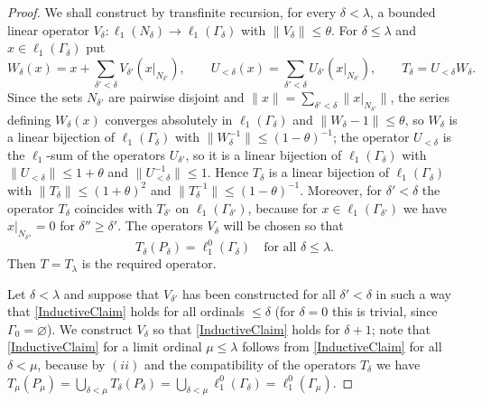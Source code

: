 \documentclass[12pt]{article}
\newcommand{\lo}[1]{\ell_1^0(#1)}
\newcommand{\ellone}[1]{\ell_1(#1)}
\newcommand{\norm}[1]{\lVert #1\rVert}
\begin{document}
\begin{proof} We shall construct by transfinite recursion, for every
    $\delta<\lambda$, a bounded linear operator
    $V_\delta:\ellone{N_\delta}\to\ellone{\Gamma_\delta}$ with
    $\norm{V_\delta}\leq\theta$. For $\delta\leq\lambda$ and
    $x\in\ellone{\Gamma_\delta}$ put
    \[
    W_\delta(x)=x+\sum_{\delta'<\delta}V_{\delta'}(x|_{N_{\delta'}}),\qquad
    U_{<\delta}(x)=\sum_{\delta'<\delta}U_{\delta'}(x|_{N_{\delta'}}),\qquad
    T_\delta=U_{<\delta}W_\delta.
    \]
    Since the sets $N_{\delta'}$ are pairwise disjoint and
    $\norm{x}=\sum_{\delta'<\delta}\norm{x|_{N_{\delta'}}}$, the series defining
    $W_\delta(x)$ converges absolutely in $\ellone{\Gamma_\delta}$ and
    $\norm{W_\delta-1}\leq\theta$, so $W_\delta$ is a linear bijection of
    $\ellone{\Gamma_\delta}$ with $\norm{W_\delta^{-1}}\leq{(1-\theta)}^{-1}$;
    the operator $U_{<\delta}$ is the $\ell_1$-sum of the operators
    $U_{\delta'}$, so it is a linear bijection of $\ellone{\Gamma_\delta}$ with
    $\norm{U_{<\delta}}\leq 1+\theta$ and $\norm{U_{<\delta}^{-1}}\leq 1$.
    Hence $T_\delta$ is a linear bijection of $\ellone{\Gamma_\delta}$ with
    $\norm{T_\delta}\leq{(1+\theta)}^2$ and $\norm{T_\delta^{-1}}\leq{(1-\theta)}^{-1}$.
    Moreover, for $\delta'<\delta$ the operator $T_\delta$ coincides with
    $T_{\delta'}$ on $\ellone{\Gamma_{\delta'}}$, because for
    $x\in\ellone{\Gamma_{\delta'}}$ we have $x|_{N_{\delta''}}=0$ for
    $\delta''\geq\delta'$. The operators $V_\delta$ will be chosen so that
    \begin{equation}\label{InductiveClaim}
    T_\delta(P_\delta)=\lo{\Gamma_\delta}\quad\text{for all }\delta\leq\lambda.
    \end{equation}
    Then $T=T_\lambda$ is the required operator.

    Let $\delta<\lambda$ and suppose that $V_{\delta'}$ has been constructed
    for all $\delta'<\delta$ in such a way that \eqref{InductiveClaim} holds
    for all ordinals $\leq\delta$ (for $\delta=0$ this is trivial, since
    $\Gamma_0=\varnothing$). We construct $V_\delta$ so that
    \eqref{InductiveClaim} holds for $\delta+1$; note that
    \eqref{InductiveClaim} for a limit ordinal $\mu\leq\lambda$ follows from
    \eqref{InductiveClaim} for all $\delta<\mu$, because by $(ii)$ and the
    compatibility of the operators $T_\delta$ we have
    $T_\mu(P_\mu)=\bigcup_{\delta<\mu}T_\delta(P_\delta)
    =\bigcup_{\delta<\mu}\lo{\Gamma_\delta}=\lo{\Gamma_\mu}$.


\end{proof}
\end{document}
